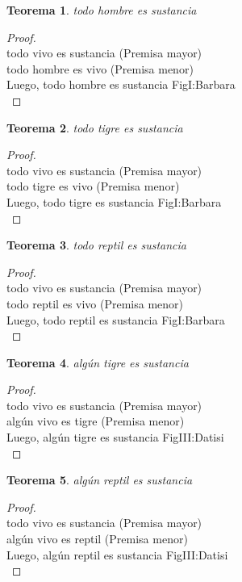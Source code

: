 ﻿\documentclass[12pt]{book}
\newtheorem{theorem}{Teorema}[chapter]
\newtheorem{proof}{Demostración}
\begin{document}
\begin{theorem}
todo hombre es sustancia
\label{th: 52}
\end{theorem}\begin{proof}\\todo vivo es sustancia	 (Premisa mayor) \\todo hombre es vivo	 (Premisa menor) \\Luego, todo hombre es sustancia	FigI:Barbara \\ \end{proof}
\begin{theorem}
todo tigre es sustancia
\label{th: 53}
\end{theorem}\begin{proof}\\todo vivo es sustancia	 (Premisa mayor) \\todo tigre es vivo	 (Premisa menor) \\Luego, todo tigre es sustancia	FigI:Barbara \\ \end{proof}
\begin{theorem}
todo reptil es sustancia
\label{th: 54}
\end{theorem}\begin{proof}\\todo vivo es sustancia	 (Premisa mayor) \\todo reptil es vivo	 (Premisa menor) \\Luego, todo reptil es sustancia	FigI:Barbara \\ \end{proof}
\begin{theorem}
algún tigre es sustancia
\label{th: 55}
\end{theorem}\begin{proof}\\todo vivo es sustancia	 (Premisa mayor) \\algún vivo es tigre	 (Premisa menor) \\Luego, algún tigre es sustancia	FigIII:Datisi \\ \end{proof}
\begin{theorem}
algún reptil es sustancia
\label{th: 56}
\end{theorem}\begin{proof}\\todo vivo es sustancia	 (Premisa mayor) \\algún vivo es reptil	 (Premisa menor) \\Luego, algún reptil es sustancia	FigIII:Datisi \\ \end{proof}
\end{document}
